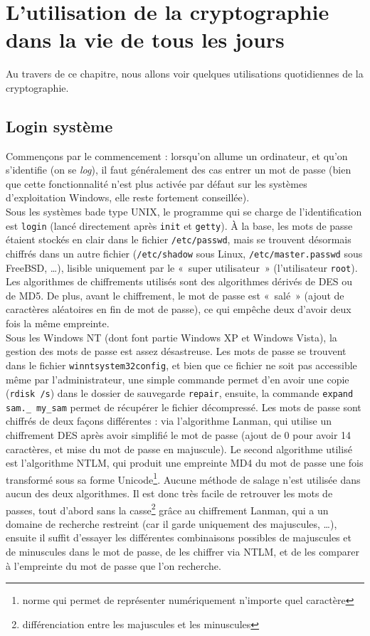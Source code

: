 \section{L'utilisation de la cryptographie dans la vie de tous les
jours}
Au travers de ce chapitre, nous allons voir quelques utilisations
quotidiennes de la cryptographie.
 
\subsection{Login système}
Commençons par le commencement : lorsqu'on allume un ordinateur,
et qu'on s'identifie (on se \emph{log}), il faut généralement 
des cas entrer un mot de passe (bien que cette fonctionnalité
n'est plus activée par défaut sur les systèmes d'exploitation
Windows, elle reste fortement conseillée).
\\
 
Sous les systèmes bade type UNIX, le programme qui se charge de
l'identification est \texttt{login} (lancé directement après
\texttt{init} et \texttt{getty}). À la base, les mots de passe
étaient stockés en clair dans le fichier \texttt{/etc/passwd},
mais se trouvent désormais chiffrés dans un autre
fichier (\texttt{/etc/shadow} sous Linux,
\texttt{/etc/master.passwd} sous FreeBSD, …), 
lisible uniquement par le «~super utilisateur~»
(l'utilisateur \texttt{root}).
Les algorithmes de chiffrements
utilisés sont des algorithmes dérivés de DES ou de MD5.
 De plus, avant le chiffrement, le mot
de passe est «~salé~» (ajout de caractères aléatoires en fin de
mot de passe), ce qui empêche deux d'avoir
deux fois la même empreinte.
\\
 
Sous les Windows NT (dont font partie Windows XP et Windows
Vista), la gestion des mots de passe est assez désastreuse. Les
mots de passe se trouvent dans le fichier
\texttt{\bslash winnt\bslash system32\bslash config}, et bien
que ce fichier ne soit pas
accessible même par l'administrateur, une simple commande permet
d'en avoir une copie (\texttt{rdisk /s}) dans le dossier de
sauvegarde \texttt{repair}, ensuite, la commande \texttt{expand
sam.\_ my\_sam}
permet de récupérer le fichier décompressé.
Les mots de passe sont chiffrés de deux façons différentes : via
l'algorithme Lanman, qui utilise un chiffrement DES après avoir
simplifié le mot de passe (ajout de 0 pour avoir 14 caractères, et
mise du mot de passe en majuscule).
Le second algorithme utilisé est l'algorithme NTLM, qui produit
une empreinte MD4 du mot de passe une fois transformé sous sa
forme Unicode\footnote{norme qui permet de représenter
numériquement n'importe quel caractère}.
 Aucune méthode de salage n'est utilisée dans aucun
des deux algorithmes. Il est donc très facile de retrouver les
mots de passes, tout d'abord sans la casse\footnote{différenciation
entre les majuscules et les minuscules} grâce au chiffrement
Lanman, qui a un domaine de recherche restreint (car il garde 
uniquement des
majuscules, …), ensuite il suffit d'essayer les différentes
combinaisons possibles de majuscules et de minuscules dans le mot
de passe, de les chiffrer via NTLM, et de les comparer à
l'empreinte du mot de passe que l'on recherche. 
\\
 
